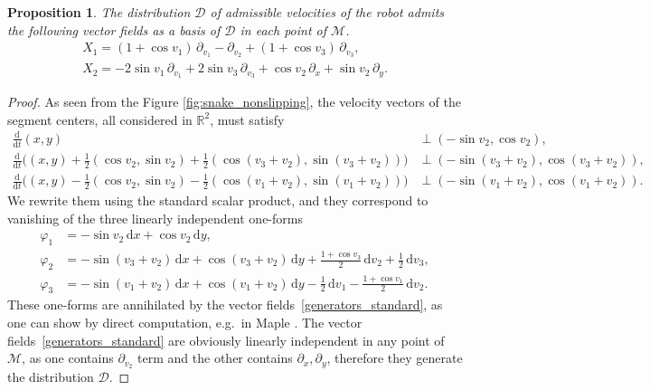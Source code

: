 \documentclass{amsart}
\theoremstyle{plain}
\newtheorem{proposition}[theorem]{Proposition}
\theoremstyle{definition}
\theoremstyle{remark}
\newcommand{\R}{\mathbb{R}}
\newcommand{\mc}[1]{\mathcal{#1}}
\newcommand{\di}{\mathrm{d}}
\begin{document}
\begin{proposition} \label{prop:generators_standard}
    The distribution $\mc{D}$ of admissible velocities of the robot admits the following vector fields as a basis of $\mc{D}$ in each point of $\mc{M}$.
    \begin{equation}\label{generators_standard}
    \begin{gathered}
        X_1 = (1 + \cos{v_1})\, \partial_{v_1} - \partial_{v_2} + (1 + \cos{v_3})\, \partial_{v_3},\\
        X_2 = -2 \sin v_1\, \partial_{v_1} + 2 \sin v_3\, \partial_{v_3} + \cos v_2\, \partial_{x} + \sin v_2\, \partial_{y}.
    \end{gathered}
    \end{equation}
\end{proposition}
\begin{proof}
    As seen from the Figure \ref{fig:snake_nonslipping}, the velocity vectors of the segment centers, all considered in $\R^2$, must satisfy
    {\footnotesize
    \begin{align*}
        \tfrac{\di}{\di t} (x,y) &\perp (-\sin v_2, \cos v_2),\\
        \tfrac{\di}{\di t} \bigl( (x,y) + \tfrac{1}{2}(\cos v_2, \sin v_2) + \tfrac{1}{2}(\cos(v_3 + v_2), \sin (v_3 + v_2)) \bigr) &\perp (-\sin (v_3+v_2), \cos (v_3 + v_2)),\\
        \tfrac{\di}{\di t} \bigl( (x,y) - \tfrac{1}{2}(\cos v_2, \sin v_2) - \tfrac{1}{2}(\cos(v_1 + v_2), \sin (v_1 + v_2)) \bigr) &\perp (-\sin (v_1+v_2), \cos (v_1 + v_2)).
    \end{align*}}%
    We rewrite them using the standard scalar product, and they correspond to vanishing of the three linearly independent one-forms
    \begin{align*}
        \varphi_1 &= -\sin v_2\, \di x + \cos v_2\, \di y,\\
        \varphi_2 &= -\sin(v_3 + v_2)\, \di x + \cos(v_3 + v_2)\, \di y + \tfrac{1+\cos v_3}{2}\, \di v_2 + \tfrac{1}{2}\, \di v_3,\\
        \varphi_3 &= -\sin(v_1 + v_2)\, \di x + \cos(v_1 + v_2)\, \di y - \tfrac{1}{2}\, \di v_1 - \tfrac{1+\cos v_1}{2}\, \di v_2.
    \end{align*}
    These one-forms are annihilated by the vector fields~\eqref{generators_standard}, as one can show by direct computation, e.g.~in Maple \cite[\texttt{std\_snake.mw}]{attached_files}.
    The vector fields~\eqref{generators_standard} are obviously linearly independent in any point of $\mc{M}$, as one contains $\partial_{v_2}$ term and the other contains $\partial_x, \partial_y$, therefore they generate the distribution $\mc{D}$.
\end{proof}
\end{document}
